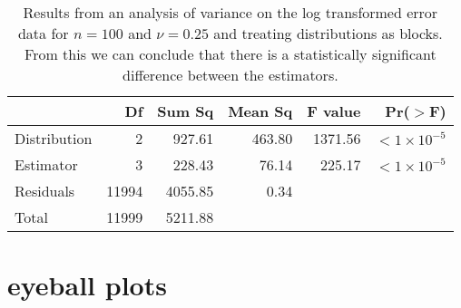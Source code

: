 \begin{table}[h!]
\caption{Results from an analysis of variance on the log transformed error data for $n=100$ and $\nu=0.25$ and treating distributions as blocks.  From this we can conclude that there is a statistically significant difference between the estimators.}
\begin{center}
\begin{tabular}{lrrrrr}
  \hline
 & Df & Sum Sq & Mean Sq & F value & Pr($>$F) \\ 
  \hline
Distribution       & 2 & 927.61 & 463.80 & 1371.56 & $<1\times 10^{-5}$ \\ 
Estimator   & 3 & 228.43 & 76.14 & 225.17 & $<1\times 10^{-5}$ \\ 
Residuals   & 11994 & 4055.85 & 0.34 &  &  \\ \hline
Total & 11999 & 5211.88 &&&\\
   \hline
\end{tabular}
\end{center}
\end{table}


\section{eyeball plots}

\label{sec:appendix.eyeballs}

